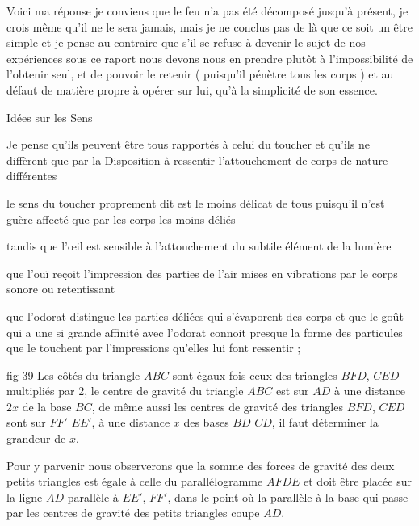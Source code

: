 \documentclass[11pt,a4paper]{article}
\begin{document}
Voici ma réponse je conviens que le feu n'a pas été décomposé jusqu'à présent, je crois même qu'il ne le sera jamais, mais je ne conclus pas de là que ce soit un être simple et je pense au contraire que s'il se refuse à devenir le sujet de nos expériences sous ce raport nous devons nous en prendre plutôt à l'impossibilité de l'obtenir seul, et de pouvoir le retenir ( puisqu'il pénètre tous les corps ) et au défaut de matière propre à opérer sur lui, qu'à la simplicité de son essence.


Idées sur les Sens

Je pense qu'ils peuvent être tous rapportés à celui du toucher et qu'ils ne diffèrent que par la Disposition à ressentir l'attouchement de corps de nature différentes

le sens du toucher proprement dit est le moins délicat de tous puisqu'il n'est guère affecté que par les corps les moins déliés

tandis que l'œil est sensible à l'attouchement du subtile élément de la lumière

que l'ouï reçoit l'impression des parties de l'air mises en vibrations par le corps sonore ou retentissant

que l'odorat distingue les parties déliées qui s'évaporent des corps et que le goût qui a une si grande affinité avec l'odorat connoit presque la forme des particules que le touchent par l'impressions qu'elles lui font ressentir ;


fig 39 Les côtés du triangle $ABC$ sont  égaux fois ceux des triangles $BFD$, $CED$ multipliés par 2, le centre de gravité du triangle $ABC$ est sur $AD$ à une distance $2x$ de la base $BC$, de même aussi les centres de gravité des triangles $BFD$, $CED$ sont sur $FF'$ $EE'$, à une distance $x$ des bases $BD$ $CD$, il faut déterminer la grandeur de $x$.

Pour y parvenir nous observerons que la somme des forces de gravité des deux petits triangles est égale à celle du parallélogramme $AFDE$ et doit être placée sur la ligne $AD$ parallèle à $EE'$, $FF'$, dans le point où la parallèle à la base qui passe par les centres de gravité des petits triangles coupe $AD$.
\end{document}
